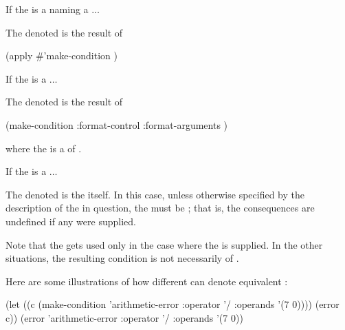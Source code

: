 \beginlist

\item{If the  is a  
              naming a   $\ldots$}

The denoted  is the result of

\code
 (apply #'make-condition  )
\endcode

\item{
If the  is a  $\ldots$
}

The denoted  is the result of 

\code
 (make-condition  
                 :format-control 
                 :format-arguments )
\endcode
{}

where the  is a  of .

\item{If the  is a  $\ldots$}

The denoted  is the  itself.
In this case, unless otherwise specified by the description of the
 in question, the  must be ;
that is, the consequences are undefined if any  were supplied. 

\endlist

Note that the  gets used only in the case where
the   is supplied.  In the other situations,
the resulting condition is not necessarily of  .

Here are some illustrations of how different 
can denote equivalent  :

\code
(let ((c (make-condition 'arithmetic-error :operator '/ :operands '(7 0))))
  (error c))
\EQ (error 'arithmetic-error :operator '/ :operands '(7 0))

